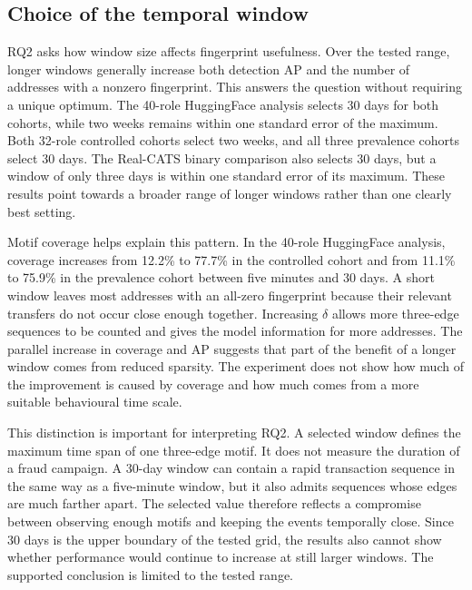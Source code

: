 \subsection{Choice of the temporal window}

RQ2 asks how window size affects fingerprint usefulness. Over the tested range,
longer windows generally increase both detection AP and the number of addresses
with a nonzero fingerprint. This answers the question without requiring a unique
optimum. The
40-role HuggingFace analysis selects 30 days for both cohorts, while two weeks
remains within one standard error of the maximum. Both 32-role controlled
cohorts select two weeks, and all three prevalence cohorts select 30 days. The
Real-CATS binary
comparison also selects 30 days, but a window of only three days is within one
standard error of its maximum. These results point towards a broader range of
longer windows rather than one clearly best setting.

Motif coverage helps explain this pattern. In the 40-role HuggingFace analysis,
coverage increases from 12.2\% to 77.7\% in the controlled cohort and from
11.1\% to 75.9\% in the prevalence cohort between five minutes and 30 days.
A short window leaves most
addresses with an all-zero fingerprint because their relevant transfers do not
occur close enough together. Increasing $\delta$ allows more three-edge
sequences to be counted and gives the model information for more addresses. The
parallel increase in coverage and AP suggests that part of the benefit of a
longer window comes from reduced sparsity. The experiment does not show how much
of the improvement is caused by coverage and how much comes from a more suitable
behavioural time scale.

This distinction is important for interpreting RQ2. A selected window defines
the maximum time span of one three-edge motif. It does not measure the duration
of a fraud campaign. A 30-day window can contain a rapid transaction sequence in
the same way as a five-minute window, but it also admits sequences whose edges
are much farther apart. The selected value therefore reflects a compromise
between observing enough motifs and keeping the events temporally close. Since
30 days is the upper boundary of the tested grid, the results also cannot show
whether performance would continue to increase at still larger windows. The
supported conclusion is limited to the tested range.

